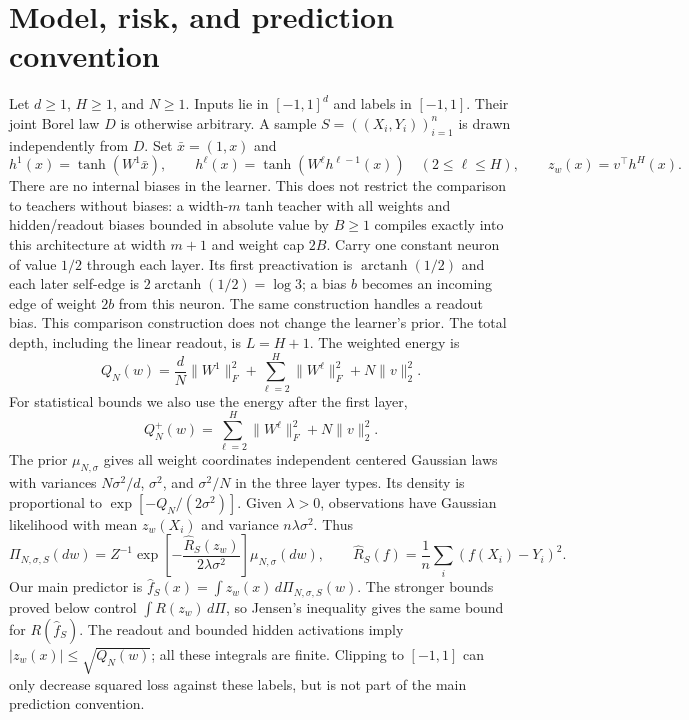 \documentclass[11pt]{article}
\theoremstyle{remark}\newtheorem{remark}[theorem]{Remark}
\begin{document}
\section{Model, risk, and prediction convention}
\label{sec:gaussian-oracle}
Let $d\ge1$, $H\ge1$, and $N\ge1$. Inputs lie in $[-1,1]^d$ and labels in $[-1,1]$. Their joint Borel law $D$ is otherwise arbitrary. A sample $S=((X_i,Y_i))_{i=1}^n$ is drawn independently from $D$. Set $\bar x=(1,x)$ and
\[
 h^1(x)=\tanh(W^1\bar x),\qquad
 h^\ell(x)=\tanh(W^\ell h^{\ell-1}(x))\quad(2\le\ell\le H),
 \qquad z_w(x)=v^\top h^H(x).
\]
There are no internal biases in the learner. This does not restrict the comparison to teachers without biases: a width-$m$ tanh teacher with all weights and hidden/readout biases bounded in absolute value by $B\ge1$ compiles exactly into this architecture at width $m+1$ and weight cap $2B$. Carry one constant neuron of value $1/2$ through each layer. Its first preactivation is $\operatorname{arctanh}(1/2)$ and each later self-edge is $2\operatorname{arctanh}(1/2)=\log3$; a bias $b$ becomes an incoming edge of weight $2b$ from this neuron. The same construction handles a readout bias. This comparison construction does not change the learner's prior. The total depth, including the linear readout, is $L=H+1$. The weighted energy is
\begin{equation}
 Q_N(w)=\frac dN\|W^1\|_F^2+\sum_{\ell=2}^H\|W^\ell\|_F^2+N\|v\|_2^2.
 \label{eq:gaussian-energy}
\end{equation}
For statistical bounds we also use the energy after the first layer,
\[ Q_N^+(w)=\sum_{\ell=2}^H\|W^\ell\|_F^2+N\|v\|_2^2. \]
The prior $\mu_{N,\sigma}$ gives all weight coordinates independent centered Gaussian laws with variances $N\sigma^2/d$, $\sigma^2$, and $\sigma^2/N$ in the three layer types. Its density is proportional to $\exp[-Q_N/(2\sigma^2)]$. Given $\lambda>0$, observations have Gaussian likelihood with mean $z_w(X_i)$ and variance $n\lambda\sigma^2$. Thus
\[
 \Pi_{N,\sigma,S}(dw)=Z^{-1}
       \exp\!\left[-\frac{\widehat R_S(z_w)}{2\lambda\sigma^2}\right]
       \mu_{N,\sigma}(dw),
 \qquad \widehat R_S(f)=\frac1n\sum_i(f(X_i)-Y_i)^2.
\]
Our main predictor is $\widehat f_S(x)=\int z_w(x)\,d\Pi_{N,\sigma,S}(w)$.
The stronger bounds proved below control $\int R(z_w)\,d\Pi$, so Jensen's inequality gives the same bound for $R(\widehat f_S)$. The readout and bounded hidden activations imply $|z_w(x)|\le\sqrt{Q_N(w)}$; all these integrals are finite. Clipping to $[-1,1]$ can only decrease squared loss against these labels, but is not part of the main prediction convention.
\end{document}
